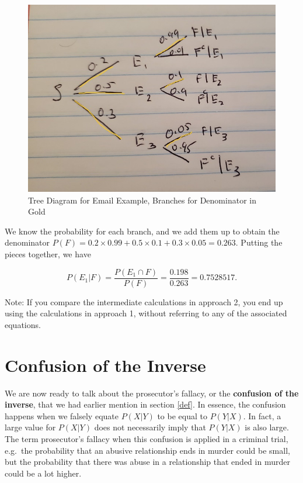 \documentclass[
]{book}
\begin{document}
\begin{figure}
\centering
\includegraphics{images/02-treepath2.jpg}
\caption{\label{fig:tree2}Tree Diagram for Email Example, Branches for Denominator in Gold}
\end{figure}

We know the probability for each branch, and we add them up to obtain the denominator \(P(F) = 0.2 \times 0.99 + 0.5 \times 0.1 + 0.3 \times 0.05 = 0.263.\) Putting the pieces together, we have

\[
P(E_1|F) = \frac{P(E_1 \cap F)}{P(F)} = \frac{0.198}{0.263} = 0.7528517.
\]

Note: If you compare the intermediate calculations in approach 2, you end up using the calculations in approach 1, without referring to any of the associated equations.

\section{Confusion of the Inverse}\label{confusion-of-the-inverse}

We are now ready to talk about the prosecutor's fallacy, or the \textbf{confusion of the inverse}, that we had earlier mention in section \ref{def}. In essence, the confusion happens when we falsely equate \(P(X|Y)\) to be equal to \(P(Y|X)\). In fact, a large value for \(P(X|Y)\) does not necessarily imply that \(P(Y|X)\) is also large. The term prosecutor's fallacy when this confusion is applied in a criminal trial, e.g.~the probability that an abusive relationship ends in murder could be small, but the probability that there was abuse in a relationship that ended in murder could be a lot higher.
\end{document}
